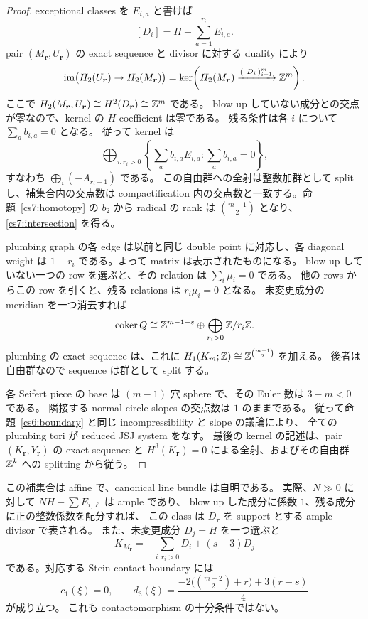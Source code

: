 \begin{proof}
exceptional classes を $E_{i,a}$ と書けば
\[
 [D_i]=H-\sum_{a=1}^{r_i}E_{i,a}.
\]
pair $(M_{\boldsymbol r},U_{\boldsymbol r})$ の exact sequence と divisor に対する
duality により
\[
 \operatorname{im}\bigl(H_2(U_{\boldsymbol r})\to H_2(M_{\boldsymbol r})\bigr)
 =\ker\!\left(H_2(M_{\boldsymbol r})\xrightarrow{(\,\cdot D_i\,)_{i=1}^m}\mathbb Z^m\right).
\]
ここで $H_2(M_{\boldsymbol r},U_{\boldsymbol r})\cong H^2(D_{\boldsymbol r})\cong\mathbb Z^m$ である。
blow up していない成分との交点が零なので、kernel の $H$ coefficient は零である。
残る条件は各 $i$ について $\sum_a b_{i,a}=0$ となる。
従って kernel は
\[
 \bigoplus_{i:r_i>0}
 \left\{\sum_a b_{i,a}E_{i,a}:\sum_a b_{i,a}=0\right\},
\]
すなわち $\bigoplus_i(-A_{r_i-1})$ である。
この自由群への全射は整数加群として split し、補集合内の交点数は compactification
内の交点数と一致する。命題~\ref{cs7:homotopy} の $b_2$ から radical の rank は
$\binom{m-1}{2}$ となり、\eqref{cs7:intersection} を得る。

plumbing graph の各 edge は以前と同じ double point に対応し、各 diagonal weight は
$1-r_i$ である。よって matrix は表示されたものになる。
blow up していない一つの row を選ぶと、その relation は $\sum_i\mu_i=0$ である。
他の rows からこの row を引くと、残る relations は $r_i\mu_i=0$ となる。
未変更成分の meridian を一つ消去すれば
\[
 \operatorname{coker}Q\cong\mathbb Z^{m-1-s}\oplus\bigoplus_{r_i>0}\mathbb Z/r_i\mathbb Z.
\]
plumbing の exact sequence は、これに
$H_1(K_m;\mathbb Z)\cong\mathbb Z^{\binom{m-1}{2}}$ を加える。
後者は自由群なので sequence は群として split する。

各 Seifert piece の base は $(m-1)$ 穴 sphere で、その Euler 数は $3-m<0$ である。
隣接する normal-circle slopes の交点数は $1$ のままである。
従って命題~\ref{cs6:boundary} と同じ incompressibility と slope の議論により、
全ての plumbing tori が reduced JSJ system をなす。
最後の kernel の記述は、pair $(K_{\boldsymbol r},Y_{\boldsymbol r})$ の exact sequence
と $H^3(K_{\boldsymbol r})=0$ による全射、およびその自由群 $\mathbb Z^k$ への splitting から従う。
\end{proof}

\begin{remark}
\label{cs7:contact}
この補集合は affine で、canonical line bundle は自明である。
実際、$N\gg0$ に対して $NH-\sum E_{i,\ell}$ は ample であり、
blow up した成分に係数 $1$、残る成分に正の整数係数を配分すれば、
この class は $D_{\boldsymbol r}$ を support とする ample divisor で表される。
また、未変更成分 $D_j=H$ を一つ選ぶと
\[
 K_{M_{\boldsymbol r}}=-\sum_{i:r_i>0}D_i+(s-3)D_j
\]
である。対応する Stein contact boundary には
\[
 c_1(\xi)=0,\qquad
 d_3(\xi)=\frac{-2\bigl(\binom{m-2}{2}+r\bigr)+3(r-s)}4
\]
が成り立つ\cite[Definition~4.2, Theorem~4.5]{Gompf}。
これも contactomorphism の十分条件ではない。
\end{remark}

